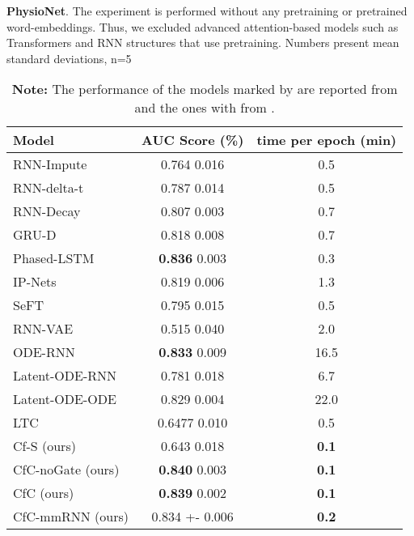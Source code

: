 \documentclass[12pt]{article}
\begin{document}
\begin{table}[t]
    \centering
    \caption{\textbf{PhysioNet}. The experiment is performed without any pretraining or pretrained word-embeddings. Thus, we excluded advanced attention-based models \cite{shukla2021multi,ad-trans2021} such as Transformers \cite{vaswani2017attention} and RNN structures that use pretraining. Numbers present mean  standard deviations, n=5}
    \begin{tabular}{lcc}
    \toprule
         Model & AUC Score (\%) & time per epoch (min) \\\hline
         RNN-Impute \cite{rubanova2019latent}& 0.764  0.016 & 0.5 \\
         RNN-delta-t \cite{rubanova2019latent} & 0.787  0.014 & 0.5  \\
         RNN-Decay \cite{rubanova2019latent} & 0.807  0.003 & 0.7 \\
         GRU-D \cite{che2018recurrent} & 0.818  0.008 & 0.7 \\
         Phased-LSTM \cite{neil2016phased} & \textbf{0.836}  0.003 & 0.3 \\
         IP-Nets \cite{shukla2018interpolation} & 0.819  0.006 & 1.3 \\
         SeFT \cite{horn2020set} & 0.795  0.015 & 0.5 \\
         RNN-VAE \cite{rubanova2019latent} & 0.515  0.040 & 2.0 \\
         ODE-RNN \cite{rubanova2019latent} & \textbf{0.833}  0.009 & 16.5 \\
         Latent-ODE-RNN \cite{rubanova2019latent} & 0.781  0.018 & 6.7 \\
         Latent-ODE-ODE \cite{rubanova2019latent} & 0.829  0.004 & 22.0 \\
         LTC \cite{hasani2021liquid} & 0.6477  0.010 & 0.5 \\
         \hline
         Cf-S (ours) & 0.643  0.018 & \textbf{0.1} \\
         CfC-noGate (ours) & \textbf{0.840}  0.003 & \textbf{0.1} \\
         CfC (ours) & \textbf{0.839}  0.002 & \textbf{0.1}  \\
         CfC-mmRNN (ours) & 0.834 +- 0.006 & \textbf{0.2} \\
         \bottomrule
    \end{tabular}
    \caption*{\footnotesize \textbf{Note:} The performance of the models marked by  are reported from  \cite{rubanova2019latent} and the ones with   from \cite{shukla2021multi}.}
    \label{tab:physionet}
\end{table}
\end{document}
